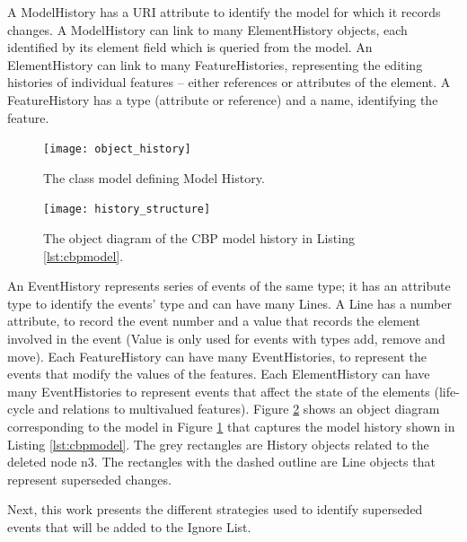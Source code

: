 A \textsf{ModelHistory} has a \textsf{URI} attribute to identify the model for which it records changes.  A \textsf{ModelHistory} can link to many \textsf{ElementHistory} objects, each identified by its \textsf{element} field which is queried from the model. An \textsf{ElementHistory} can link to many \textsf{FeatureHistories}, representing the editing histories of individual features -- either references or attributes of the element. A \textsf{FeatureHistory} has a \textsf{type} (attribute or reference) and a \textsf{name}, identifying the feature.

\begin{figure}[ht]
\centering
\texttt{[image: object\_history]}
\caption{The class model defining Model History.}
\label{fig:object_history}
\end{figure}

\begin{figure}[ht]
\centering
\texttt{[image: history\_structure]}
\caption{The object diagram of the CBP model history in Listing \ref{lst:cbpmodel}.}
\label{fig:history_structure}
\end{figure}

An \textsf{EventHistory} represents series of events of the same type; it has an attribute \textsf{type} to identify the events' type and can have many \textsf{Line}s. A \textsf{Line} has a \textsf{number} attribute, to record the event number and a \textsf{value} that records the element involved in the event (Value is only used for events with types \textsf{add}, \textsf{remove} and \textsf{move}). Each \textsf{FeatureHistory} can have many \textsf{EventHistories}, to represent the events that modify the values of the features. Each \textsf{ElementHistory} can have many \textsf{EventHistories} to represent events that affect the state of the elements (life-cycle and relations to multivalued features). Figure \ref{fig:history_structure} shows an object diagram corresponding to the model in Figure \ref{fig:object_history} that captures the model history shown in Listing \ref{lst:cbpmodel}. The grey rectangles are \textsf{History} objects related to the deleted node \textsf{n3}. The rectangles with the dashed outline are \textsf{Line} objects that represent superseded changes. 

Next, this work presents the different strategies used to identify superseded events that will be added to the Ignore List.   

